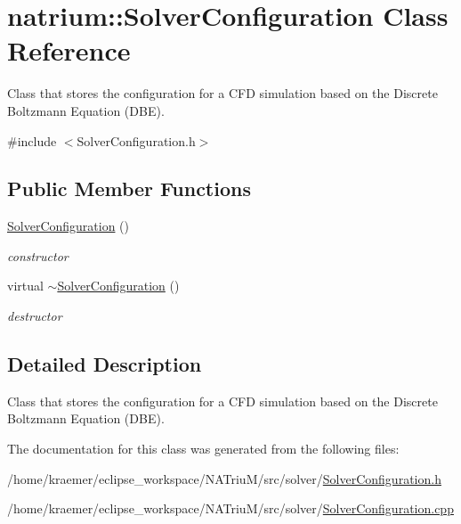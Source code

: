 \hypertarget{classnatrium_1_1SolverConfiguration}{\section{natrium\-:\-:\-Solver\-Configuration \-Class \-Reference}
\label{classnatrium_1_1SolverConfiguration}
}


\-Class that stores the configuration for a \-C\-F\-D simulation based on the \-Discrete \-Boltzmann \-Equation (\-D\-B\-E).  




{\ttfamily \#include $<$\-Solver\-Configuration.\-h$>$}

\subsection*{\-Public \-Member \-Functions}
\begin{DoxyCompactItemize}
\item 
\hypertarget{classnatrium_1_1SolverConfiguration_a9aa7109e2eac9b8a7b424a35509ccdb0}{\hyperlink{classnatrium_1_1SolverConfiguration_a9aa7109e2eac9b8a7b424a35509ccdb0}{\-Solver\-Configuration} ()}\label{classnatrium_1_1SolverConfiguration_a9aa7109e2eac9b8a7b424a35509ccdb0}

\begin{DoxyCompactList}\small\item\em constructor \end{DoxyCompactList}\item 
\hypertarget{classnatrium_1_1SolverConfiguration_a830083ab7dceb06a4cf6320044e48d2f}{virtual \hyperlink{classnatrium_1_1SolverConfiguration_a830083ab7dceb06a4cf6320044e48d2f}{$\sim$\-Solver\-Configuration} ()}\label{classnatrium_1_1SolverConfiguration_a830083ab7dceb06a4cf6320044e48d2f}

\begin{DoxyCompactList}\small\item\em destructor \end{DoxyCompactList}\end{DoxyCompactItemize}


\subsection{\-Detailed \-Description}
\-Class that stores the configuration for a \-C\-F\-D simulation based on the \-Discrete \-Boltzmann \-Equation (\-D\-B\-E). 

\-The documentation for this class was generated from the following files\-:\begin{DoxyCompactItemize}
\item 
/home/kraemer/eclipse\-\_\-workspace/\-N\-A\-Triu\-M/src/solver/\hyperlink{SolverConfiguration_8h}{\-Solver\-Configuration.\-h}\item 
/home/kraemer/eclipse\-\_\-workspace/\-N\-A\-Triu\-M/src/solver/\hyperlink{SolverConfiguration_8cpp}{\-Solver\-Configuration.\-cpp}\end{DoxyCompactItemize}
